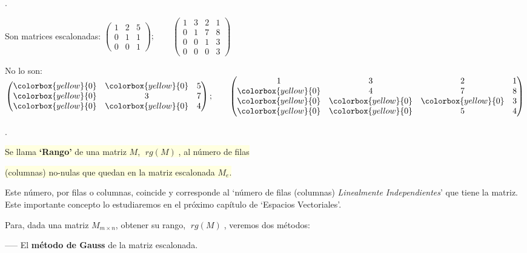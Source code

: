 \begin{ejem}.

Son matrices escalonadas: $\left( \begin{matrix} 1&2&5\\0&1&1\\0&0&1  \end{matrix} \right); \qquad \left( \begin{matrix} 1&3&2&1\\0&1&7&8\\0&0&1&3\\0&0&0&3 \end{matrix} \right)$

No lo son: $\left( \begin{matrix} \colorbox{yellow}{0}&\colorbox{yellow}{0}&5\\ \colorbox{yellow}{0}&3&7\\ \colorbox{yellow}{0}&\colorbox{yellow}{0}&4  \end{matrix} \right); \qquad \left( \begin{matrix}  1&3&2&1\\\colorbox{yellow}{0}&4&7&8\\\colorbox{yellow}{0}&\colorbox{yellow}{0}&\colorbox{yellow}{0}&3\\ \colorbox{yellow}{0}&\colorbox{yellow}{0}&5&4  \end{matrix} \right)$
	
\end{ejem}

\begin{defi}.

\colorbox{LightYellow}{Se llama \textbf{`Rango'} de una matriz $M$, $\; rg(M)\;$, al número de filas}

 \colorbox{LightYellow}{(columnas) no-nulas que quedan en la matriz escalonada $M_e$.}

\end{defi}

Este número, por filas o columnas, coincide y corresponde al `número de filas (columnas) \emph{Linealmente Independientes}' que tiene la matriz. Este importante concepto lo estudiaremos en el próximo capítulo de `Espacios Vectoriales'.

Para, dada una matriz $M_{m \times n}$, obtener su rango, $\; rg(M) \;$, veremos dos métodos:

\hspace{3mm} ----- El \textbf{método de Gauss} de la matriz escalonada.

